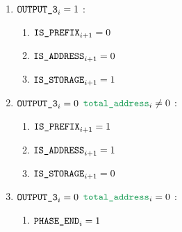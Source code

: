 \begin{enumerate}[resume]
\begin{enumerate}[resume]
\begin{enumerate}
					\item \If $\texttt{OUTPUT\_3}_{i} = 1$ \Then:
						\begin{enumerate}
							\item $\texttt{IS\_PREFIX} _{i+1} = 0$
							\item $\texttt{IS\_ADDRESS}   _{i+1} = 0$
							\item $\texttt{IS\_STORAGE}    _{i+1} = 1$
						\end{enumerate}

					\item \If $\texttt{OUTPUT\_3}_{i} = 0$ \et $\locTotNbOfAddress_{i} \neq 0$ \Then:
						\begin{enumerate}
							\item $\texttt{IS\_PREFIX} _{i+1} = 1$
							\item $\texttt{IS\_ADDRESS}   _{i+1} = 1$
							\item $\texttt{IS\_STORAGE}    _{i+1} = 0$
						\end{enumerate}

					\item \If $\texttt{OUTPUT\_3}_{i} = 0$ \et $\locTotNbOfAddress_{i} = 0$ \Then:
						\begin{enumerate}
							\item $\texttt{PHASE\_END} _{i} = 1$
						\end{enumerate}
				\end{enumerate}			
		\end{enumerate}


\end{enumerate}
